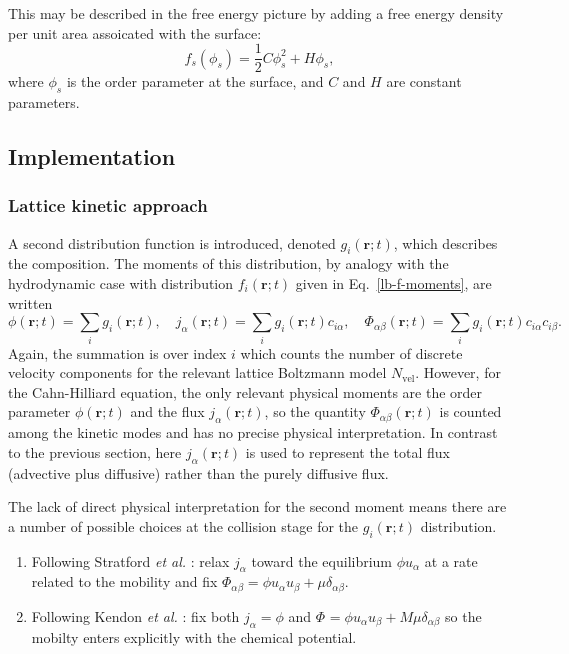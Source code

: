 This may be described in the free energy picture by adding a free
energy density per unit area assoicated with the surface:
\begin{equation}
f_s (\phi_s)= \textstyle{\frac{1}{2}} C \phi_s^2 + H \phi_s,
\end{equation}
where $\phi_s$ is the order parameter at the surface, and $C$ and $H$ are
constant parameters.

\subsection{Implementation}

\subsubsection{Lattice kinetic approach}

A second distribution function is introduced, denoted $g_i(\mathbf{r};t)$,
which describes the composition. The moments of this distribution, by
analogy with the hydrodynamic case with distribution
$f_i(\mathbf{r};t)$ given in
Eq.~\ref{lb-f-moments}, are written
\begin{equation}
\phi(\mathbf{r};t) = \sum_i g_i (\mathbf{r};t), \quad
j_\alpha(\mathbf{r};t) = \sum_i g_i(\mathbf{r};t) c_{i\alpha}, \quad
\Phi_{\alpha\beta}(\mathbf{r};t) = \sum_i g_i(\mathbf{r};t)
c_{i\alpha}c_{i\beta}.
\end{equation}
Again, the summation is over index $i$ which counts the number of
discrete velocity components for the relevant lattice Boltzmann
model $N_{\mathrm{vel}}$. However, for the Cahn-Hilliard equation,
the only relevant physical moments are the order parameter
$\phi(\mathbf{r};t)$ and the flux $j_\alpha(\mathbf{r};t)$, so
the quantity $\Phi_{\alpha\beta}(\mathbf{r};t)$ is counted among
the kinetic modes and has no precise physical interpretation. In
contrast to the previous section, here $j_\alpha(\mathbf{r};t)$
is used to represent the total flux (advective
plus diffusive) rather than the purely diffusive flux.

The lack of direct physical interpretation for the second moment
means there are a number of possible choices at the collision
stage for the $g_i(\mathbf{r};t)$ distribution.
\begin{enumerate}
\item
Following Stratford \textit{et al.} \cite{j-stat-phys-2005}:
relax $j_\alpha$ toward the equilibrium $\phi u_\alpha$
at a rate related to the mobility and fix $\Phi_{\alpha\beta} =
\phi u_\alpha u_\beta + \mu \delta_{\alpha\beta}$.
\item
Following Kendon \textit{et al.} \cite{kendon2001}: fix both
$j_\alpha = \phi$ and
$\Phi_{} = \phi u_\alpha u_\beta + M\mu \delta_{\alpha\beta}$ so the
mobilty enters explicitly with the chemical potential.
\end{enumerate}

